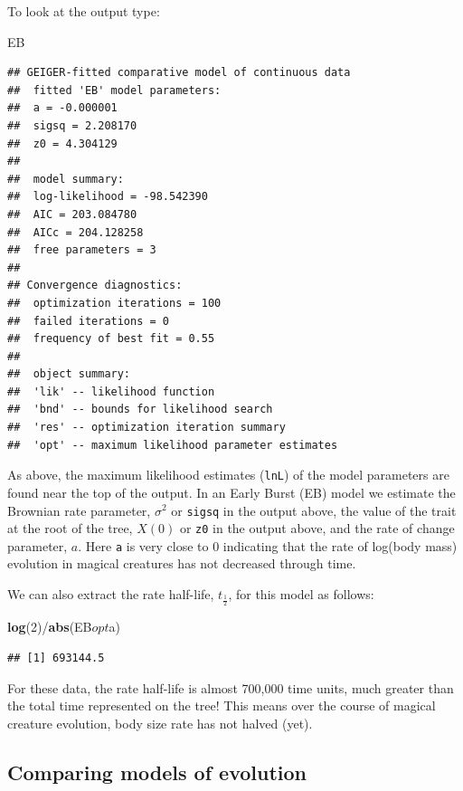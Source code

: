\documentclass[]{book}
\newenvironment{Shaded}{\begin{snugshade}}{\end{snugshade}}
\newcommand{\KeywordTok}[1]{\textcolor[rgb]{0.13,0.29,0.53}{\textbf{{#1}}}}
\newcommand{\DecValTok}[1]{\textcolor[rgb]{0.00,0.00,0.81}{{#1}}}
\newcommand{\NormalTok}[1]{{#1}}
\begin{document}
To look at the output type:

\begin{Shaded}
\begin{Highlighting}[]
\NormalTok{EB}
\end{Highlighting}
\end{Shaded}

\begin{verbatim}
## GEIGER-fitted comparative model of continuous data
##  fitted 'EB' model parameters:
##  a = -0.000001
##  sigsq = 2.208170
##  z0 = 4.304129
## 
##  model summary:
##  log-likelihood = -98.542390
##  AIC = 203.084780
##  AICc = 204.128258
##  free parameters = 3
## 
## Convergence diagnostics:
##  optimization iterations = 100
##  failed iterations = 0
##  frequency of best fit = 0.55
## 
##  object summary:
##  'lik' -- likelihood function
##  'bnd' -- bounds for likelihood search
##  'res' -- optimization iteration summary
##  'opt' -- maximum likelihood parameter estimates
\end{verbatim}

As above, the maximum likelihood estimates (\texttt{lnL}) of the model
parameters are found near the top of the output. In an Early Burst (EB)
model we estimate the Brownian rate parameter, \(\sigma^2\) or
\texttt{sigsq} in the output above, the value of the trait at the root
of the tree, \(X(0)\) or \texttt{z0} in the output above, and the rate
of change parameter, \(a\). Here \texttt{a} is very close to 0
indicating that the rate of log(body mass) evolution in magical
creatures has not decreased through time.

We can also extract the rate half-life, \(t_{\frac{1}{2}}\), for this
model as follows:

\begin{Shaded}
\begin{Highlighting}[]
\KeywordTok{log}\NormalTok{(}\DecValTok{2}\NormalTok{)/}\KeywordTok{abs}\NormalTok{(EB$opt$a)}
\end{Highlighting}
\end{Shaded}

\begin{verbatim}
## [1] 693144.5
\end{verbatim}

For these data, the rate half-life is almost 700,000 time units, much
greater than the total time represented on the tree! This means over the
course of magical creature evolution, body size rate has not halved
(yet).

\subsection{Comparing models of
evolution}\label{comparing-models-of-evolution}
\end{document}
